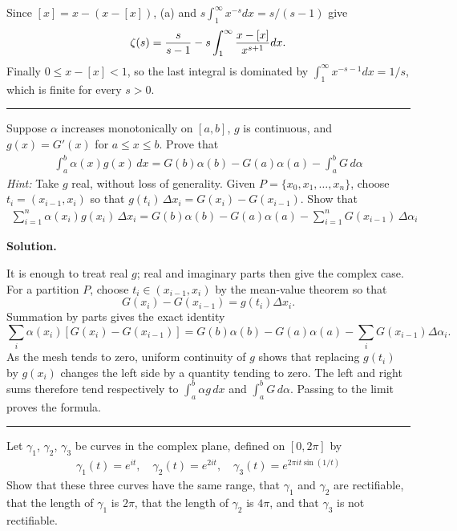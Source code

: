 \documentclass[12pt]{article}
\theoremstyle{definition}
\begin{document}
Since $[x]=x-(x-[x])$, (a) and $s\int_1^\infty x^{-s}dx=s/(s-1)$ give
\[
 \zeta(s)={s\over s-1}-s\int_1^\infty{x-[x]\over x^{s+1}}dx.
\]
Finally $0\le x-[x]<1$, so the last integral is dominated by $\int_1^\infty x^{-s-1}dx=1/s$, which is finite for every $s>0$.




\bigskip\noindent\hrule\bigskip

Suppose $\alpha$ increases monotonically on $[a,b]$, $g$ is continuous, and $g(x)=G'(x)$ for $a\le x\le b$. Prove that
\begin{align*}
\int_a^b\alpha(x)g(x)\,dx=G(b)\alpha(b)-G(a)\alpha(a)-\int_a^bG\,d\alpha
\end{align*}
\textit{Hint:} Take $g$ real, without loss of generality. Given $P=\{x_0,x_1,\ldots,x_n\}$, choose $t_i=(x_{i-1},x_i)$ so that $g(t_i)\,\Delta x_i=G(x_i)-G(x_{i-1})$. Show that
\begin{align*}
\sum_{i=1}^n\alpha(x_i)g(x_i)\,\Delta x_i=G(b)\alpha(b)-G(a)\alpha(a)-\sum_{i=1}^nG(x_{i-1})\,\Delta\alpha_i
\end{align*}

\smallskip
\noindent\textbf{Solution.}\quad


It is enough to treat real $g$; real and imaginary parts then give the complex case.  For a partition $P$, choose $t_i\in(x_{i-1},x_i)$ by the mean-value theorem so that
\[
 G(x_i)-G(x_{i-1})=g(t_i)\Delta x_i.
\]
Summation by parts gives the exact identity
\[
 \sum_i\alpha(x_i)[G(x_i)-G(x_{i-1})]
 =G(b)\alpha(b)-G(a)\alpha(a)-\sum_iG(x_{i-1})\Delta\alpha_i.
\]
As the mesh tends to zero, uniform continuity of $g$ shows that replacing $g(t_i)$ by $g(x_i)$ changes the left side by a quantity tending to zero.  The left and right sums therefore tend respectively to $\int_a^b\alpha g\,dx$ and $\int_a^bG\,d\alpha$.  Passing to the limit proves the formula.




\bigskip\noindent\hrule\bigskip

Let $\gamma_1$, $\gamma_2$, $\gamma_3$ be curves in the complex plane, defined on $[0,2\pi]$ by
\begin{align*}
\gamma_1(t)=e^{it},\quad \gamma_2(t)=e^{2it},\quad \gamma_3(t)=e^{2\pi it\sin\left(1/t\right)}
\end{align*}
Show that these three curves have the same range, that $\gamma_1$ and $\gamma_2$ are rectifiable, that the length of $\gamma_1$ is $2\pi$, that the length of $\gamma_2$ is $4\pi$, and that $\gamma_3$ is not rectifiable.
\end{document}
